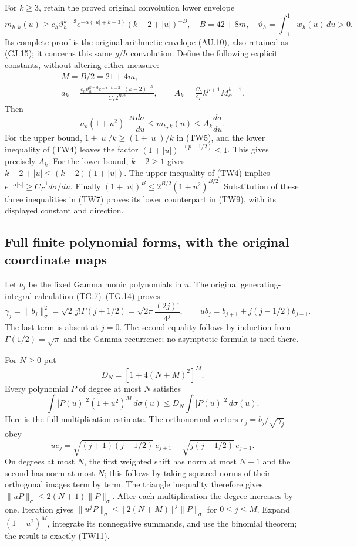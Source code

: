For $k\geq3$, retain the proved original convolution lower envelope
\[
 m_{h,k}(u)\geq c_h\vartheta_h^{k-3}
 e^{-\alpha(|u|+k-3)}(k-2+|u|)^{-B},\quad
 B=42+8m,\quad \vartheta_h=\int_{-1}^{1}w_h(u)\,du>0.
 \tag{TW7}
\]
Its complete proof is the original arithmetic envelope (AU.10), also
retained as (CJ.15); it concerns this same $g/h$ convolution.
Define the following explicit constants, without altering either measure:
\[
 \begin{gathered}
 M=B/2=21+4m,\\
 a_k=\frac{c_h\vartheta_h^{k-3}e^{-\alpha(k-3)}(k-2)^{-B}}
 {C_\Gamma 2^{B/2}},\qquad
 A_k=\frac{C_h}{c_\Gamma}k^{p+1}M_\alpha^{k-1}.
 \end{gathered}\tag{TW8}
\]
Then
\[
 \boxed{
 a_k(1+u^2)^{-M}\frac{d\sigma}{du}
 \leq m_{h,k}(u)\leq A_k\frac{d\sigma}{du}.}
 \tag{TW9}
\]
For the upper bound, $1+|u|/k\geq(1+|u|)/k$ in (TW5), and the
lower inequality of (TW4) leaves the factor
$(1+|u|)^{-(p-1/2)}\leq1$.  This gives precisely $A_k$.
For the lower bound, $k-2\geq1$ gives
$k-2+|u|\leq(k-2)(1+|u|)$.  The upper inequality of (TW4) implies
$e^{-\alpha|u|}\geq C_\Gamma^{-1}d\sigma/du$.
Finally $(1+|u|)^B\leq2^{B/2}(1+u^2)^{B/2}$.
Substitution of these three inequalities in (TW7) proves its lower
counterpart in (TW9), with its displayed constant and direction.

\subsection{Full finite polynomial forms, with the original coordinate maps}

Let $b_j$ be the fixed Gamma monic polynomials in $u$.  The original
generating-integral calculation (TG.7)--(TG.14) proves
\[
 \gamma_j=\|b_j\|_\sigma^2
 =\sqrt2\,j!\Gamma(j+1/2)
 =\sqrt{2\pi}\frac{(2j)!}{4^j},\qquad
 u b_j=b_{j+1}+j(j-1/2)b_{j-1}.
 \tag{TW10}
\]
The last term is absent at $j=0$.  The second equality follows by
induction from $\Gamma(1/2)=\sqrt\pi$ and the Gamma recurrence; no
asymptotic formula is used there.

For $N\geq0$ put
\[
 D_N=[1+4(N+M)^2]^M.
\]
Every polynomial $P$ of degree at most $N$ satisfies
\[
 \int |P(u)|^2(1+u^2)^M\,d\sigma(u)
 \leq D_N\int |P(u)|^2\,d\sigma(u).
 \tag{TW11}
\]
Here is the full multiplication estimate.  The orthonormal vectors
$e_j=b_j/\sqrt{\gamma_j}$ obey
\[
 u e_j=\sqrt{(j+1)(j+1/2)}\,e_{j+1}
       +\sqrt{j(j-1/2)}\,e_{j-1}.
\]
On degrees at most $N$, the first weighted shift has norm at most
$N+1$ and the second has norm at most $N$; this follows by taking
squared norms of their orthogonal images term by term.
The triangle inequality therefore gives
$\|uP\|_\sigma\leq2(N+1)\|P\|_\sigma$.
After each multiplication the degree increases by one.  Iteration gives
$\|u^jP\|_\sigma\leq[2(N+M)]^j\|P\|_\sigma$ for $0\leq j\leq M$.
Expand $(1+u^2)^M$, integrate its nonnegative summands, and use the
binomial theorem; the result is exactly (TW11).

